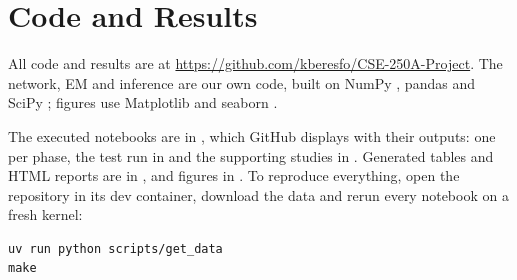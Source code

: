 \FloatBarrier
\section{Code and Results}
\label{app:code}
All code and results are at \url{https://github.com/kberesfo/CSE-250A-Project}.
The network, EM and inference are our own code, built on NumPy
\citep{harris2020numpy}, pandas \citep{mckinney2010pandas} and SciPy
\citep{virtanen2020scipy}; figures use Matplotlib \citep{hunter2007matplotlib}
and seaborn \citep{waskom2021seaborn}.

The executed notebooks are in , which GitHub displays with
their outputs: one  per phase, the test run in  and
the supporting studies in . Generated tables and HTML reports are
in , and figures in . To reproduce everything, open
the repository in its dev container, download the data and rerun every notebook
on a fresh kernel:
\begin{verbatim}
uv run python scripts/get_data
make
\end{verbatim}
\FloatBarrier